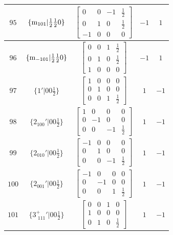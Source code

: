 \documentclass[fleqn,8pt]{jsarticle}
\begin{document}
\begin{longtable}{ccccc}
$ 95 $ & $ \{{\rm m}_{101}|\frac{1}{2} \frac{1}{2} 0\} $ & $ \begin{bmatrix} 0 & 0 & -1 & \frac{1}{2} \\ 0 & 1 & 0 & \frac{1}{2} \\ -1 & 0 & 0 & 0 \end{bmatrix} $ & $ -1 $ & $ 1 $ \\ \hline
$ 96 $ & $ \{{\rm m}_{-101}|\frac{1}{2} \frac{1}{2} 0\} $ & $ \begin{bmatrix} 0 & 0 & 1 & \frac{1}{2} \\ 0 & 1 & 0 & \frac{1}{2} \\ 1 & 0 & 0 & 0 \end{bmatrix} $ & $ -1 $ & $ 1 $ \\ \hline
$ 97 $ & $ \{1{}'|0 0 \frac{1}{2}\} $ & $ \begin{bmatrix} 1 & 0 & 0 & 0 \\ 0 & 1 & 0 & 0 \\ 0 & 0 & 1 & \frac{1}{2} \end{bmatrix} $ & $ 1 $ & $ -1 $ \\ \hline
$ 98 $ & $ \{2{}_{100}{}'|0 0 \frac{1}{2}\} $ & $ \begin{bmatrix} 1 & 0 & 0 & 0 \\ 0 & -1 & 0 & 0 \\ 0 & 0 & -1 & \frac{1}{2} \end{bmatrix} $ & $ 1 $ & $ -1 $ \\ \hline
$ 99 $ & $ \{2{}_{010}{}'|0 0 \frac{1}{2}\} $ & $ \begin{bmatrix} -1 & 0 & 0 & 0 \\ 0 & 1 & 0 & 0 \\ 0 & 0 & -1 & \frac{1}{2} \end{bmatrix} $ & $ 1 $ & $ -1 $ \\ \hline
$ 100 $ & $ \{2{}_{001}{}'|0 0 \frac{1}{2}\} $ & $ \begin{bmatrix} -1 & 0 & 0 & 0 \\ 0 & -1 & 0 & 0 \\ 0 & 0 & 1 & \frac{1}{2} \end{bmatrix} $ & $ 1 $ & $ -1 $ \\ \hline
$ 101 $ & $ \{3^{+}_{\,\,111}{}'|0 0 \frac{1}{2}\} $ & $ \begin{bmatrix} 0 & 0 & 1 & 0 \\ 1 & 0 & 0 & 0 \\ 0 & 1 & 0 & \frac{1}{2} \end{bmatrix} $ & $ 1 $ & $ -1 $ \\ \hline

\end{longtable}
\end{document}
